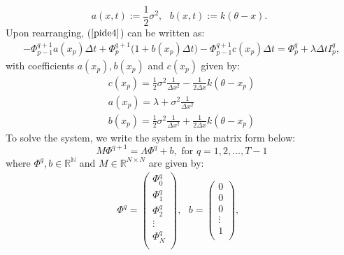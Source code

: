 \documentclass[11pt,reqno]{article}
\theoremstyle{definition}
\begin{document}
$$ a(x,t):= \frac{1}{2} \sigma^2, \,\,\,\, b(x,t):= k(\theta -x). \,\,\, $$
Upon rearranging, ($\ref{pide4}$) can be written as: 
\begin{eqnarray}\label{ou-scheme}
	- \Phi_{p-1}^{q+1} a(x_p) \Delta t   + \Phi_p^{q+1}\big(1+ b(x_p)\Delta t\big) - \Phi_{p-1}^{q+1} c(x_p) \Delta t  = \Phi_p^q + \lambda \Delta t I_p^q,
\end{eqnarray}
with coefficients $a(x_p), b(x_p)$ and $c(x_p)$ given by: 
\begin{eqnarray}
	c(x_p) = \frac{1}{2}\sigma^2 \frac{1}{\Delta x^2} - \frac{1}{2\Delta x}k(\theta-x_p) \\
	a(x_p) = \lambda + \sigma^2 \frac{1}{\Delta x^2} \\
	b(x_p) = \frac{1}{2}\sigma^2 \frac{1}{\Delta x^2} + \frac{1}{2\Delta x}k(\theta-x_p)
\end{eqnarray}
To solve the system, we write the system in the matrix form below:
$$ M \Phi^{q+1} = \Lambda \Phi^q + b, \text{ for } q = 1, 2, \dots, T-1$$
where $\Phi^q, b \in \mathbb{R^N}$ and $M \in \mathbb{R}^{N\times N}$ are given by:
	\begin{eqnarray} \label{matrices_1}
\Phi^{q} =\left( \begin{array}{c}
	\Phi^q_0 \\
	\Phi^q_1 \\
	\Phi^q_2\\
	\vdots \\
	\Phi^q_N \\
	\end{array}
	\right),
	\,\,\,\,
b=\left( \begin{array}{c}
	0 \\
	0 \\
	0 \\
	\vdots \\
	1 \\
	\end{array}
	\right),
		\,\,\,\,
\end{eqnarray}
\end{document}
